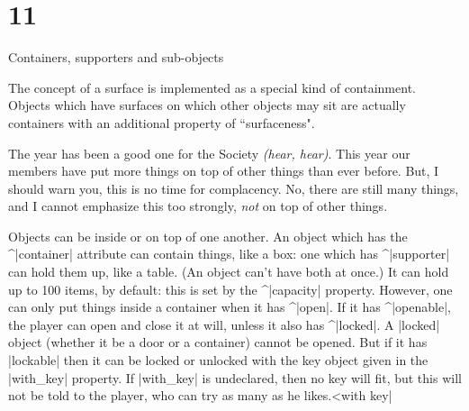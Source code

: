\newpage
\section{11}{Containers, supporters and sub-objects}

\quote
The concept of a surface is implemented as a special kind of containment.
Objects which have surfaces on which other objects may sit are actually
containers with an additional property of ``surfaceness".

\widequote
The year has been a good one for the Society {\sl (hear, hear)}.
This year our members have put more things on top of other things
than ever before.  But, I should warn you, this is no time for
complacency.  No, there are still many things, and I cannot
emphasize this too strongly, {\sl not} on top of other things.

\noindent
Objects can be inside or on top of one another.  An object which has the
^|container| attribute can contain things, like a box: one which has
^|supporter| can hold them up, like a table.  (An object can't have both at
once.)  It can hold up to 100 items, by default: this is set by the ^|capacity|
property.
However, one can only put things inside a container when it has ^|open|.
If it has ^|openable|, the player can open and close it at will, unless
it also has ^|locked|.  A |locked| object (whether it be a door or a
container) cannot be opened.  But if it has |lockable| then it can be
locked or unlocked with the key object given in the |with_key| property.
If |with_key| is undeclared, then no key will fit, but this will not be told
to the player, who can try as many as he likes.^^|with key|

